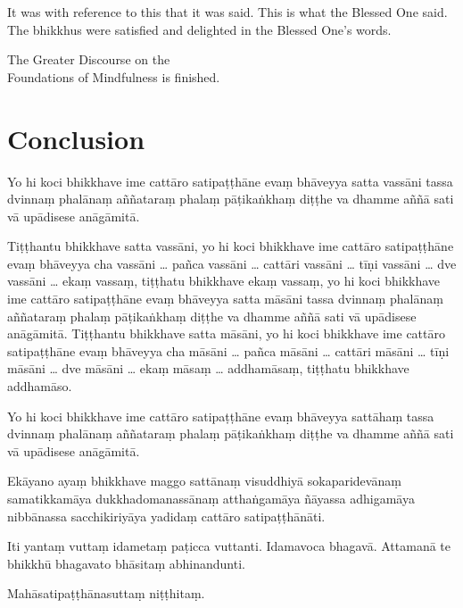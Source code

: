 It was with reference to this that it was said. This is what the Blessed One
said. The bhikkhus were satisfied and delighted in the Blessed One's words.

\bigskip

{\centering\instructionFont\color{instruction}\upshape

  The Greater Discourse on the\\
  Foundations of Mindfulness is finished.

}

\paliPage
\chapter*{Conclusion}

Yo hi koci bhikkhave ime cattāro satipaṭṭhāne evaṃ bhāveyya satta vassāni tassa
dvinnaṃ phalānaṃ aññataraṃ phalaṃ pāṭikaṅkhaṃ diṭṭhe va dhamme aññā sati vā
upādisese anāgāmitā.

Tiṭṭhantu bhikkhave satta vassāni, yo hi koci bhikkhave ime cattāro satipaṭṭhāne
evaṃ bhāveyya cha vassāni \ldots{} pañca vassāni \ldots{} cattāri vassāni
\ldots{} tīṇi vassāni \ldots{} dve vassāni \ldots{} ekaṃ vassaṃ, tiṭṭhatu
bhikkhave ekaṃ vassaṃ, yo hi koci bhikkhave ime cattāro satipaṭṭhāne evaṃ
bhāveyya satta māsāni tassa dvinnaṃ phalānaṃ aññataraṃ phalaṃ pāṭikaṅkhaṃ diṭṭhe
va dhamme aññā sati vā upādisese anāgāmitā. Tiṭṭhantu bhikkhave satta māsāni, yo
hi koci bhikkhave ime cattāro satipaṭṭhāne evaṃ bhāveyya cha māsāni \ldots{}
pañca māsāni \ldots{} cattāri māsāni \ldots{} tīṇi māsāni \ldots{} dve māsāni
\ldots{} ekaṃ māsaṃ \ldots{} addhamāsaṃ, tiṭṭhatu bhikkhave addhamāso.

Yo hi koci bhikkhave ime cattāro satipaṭṭhāne evaṃ bhāveyya sattāhaṃ tassa
dvinnaṃ phalānaṃ aññataraṃ phalaṃ pāṭikaṅkhaṃ diṭṭhe va dhamme aññā sati vā
upādisese anāgāmitā.

Ekāyano ayaṃ bhikkhave maggo sattānaṃ visuddhiyā sokaparidevānaṃ samatikkamāya
dukkhadomanassānaṃ atthaṅgamāya ñāyassa adhigamāya nibbānassa sacchikiriyāya
yadidaṃ cattāro satipaṭṭhānāti.

Iti yantaṃ vuttaṃ idametaṃ paṭicca vuttanti. Idamavoca bhagavā. Attamanā te
bhikkhū bhagavato bhāsitaṃ abhinandunti.

\bigskip

{\centering\instructionFont\color{instruction}\upshape

  Mahāsatipaṭṭhānasuttaṃ niṭṭhitaṃ.

}

\resumeNormalText